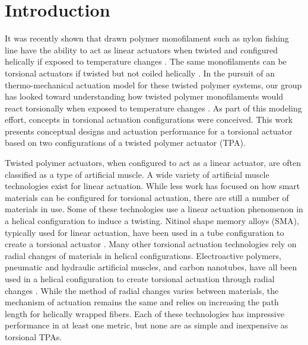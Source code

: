 \documentclass[twocolumn,10pt]{asme2e}
\begin{document}
%
%
%
% 
%


\section{Introduction}
It was recently shown that drawn polymer monofilament such as nylon fishing line have the ability to act as linear actuators when twisted and configured helically if exposed to temperature changes \cite{haines_artificial}. The same monofilaments can be torsional actuators if twisted but not coiled helically \cite{haines_artificial, aziz_controlled}.  In the pursuit of an thermo-mechanical actuation model for these twisted polymer systems, our group has looked toward understanding how twisted polymer monofilaments would react torsionally when exposed to temperature changes \cite{shafer_first}. As part of this modeling effort, concepts in torsional actuation configurations were conceived. This work presents conceptual designs and actuation performance for a torsional actuator based on two configurations of a twisted polymer actuator (TPA). 

Twisted polymer actuators, when configured to act as a linear actuator, are often classified as a type of artificial muscle. A wide variety of artificial muscle technologies exist for linear actuation. While less work has focused on how smart materials can be configured for torsional actuation, there are still a number of materials in use. Some of these technologies use a linear actuation phenomenon in a helical configuration to induce a twisting. Nitinol shape memory alloys (SMA), typically used for linear actuation, have been used in a tube configuration to create a torsional actuator \cite{jardine_shape}. Many other torsional actuation technologies rely on  radial changes of materials in helical configurations. Electroactive polymers, pneumatic and hydraulic artificial muscles, and carbon nanotubes, have all been used in a helical configuration to create torsional actuation through radial changes \cite{suh_torsional,chun_hybrid,fang_fiber,sanan_pneumatic}. While the method of radial changes varies between materials, the mechanism of actuation remains the same and relies on increasing the path length for helically wrapped fibers. Each of these technologies has impressive performance in at least one metric, but none are as simple and inexpensive as torsional TPAs.
\end{document}
